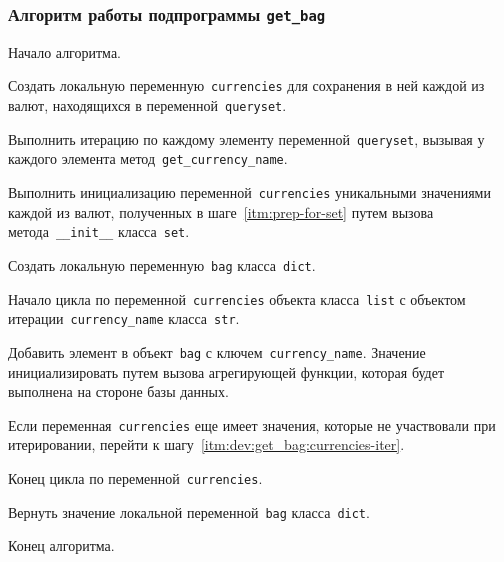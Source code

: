 \subsubsection{Алгоритм работы подпрограммы \lstinline{get_bag}}

\begin{enumerate_step}
    \item Начало алгоритма.

    \item Создать локальную переменную~\lstinline{currencies} для сохранения в ней каждой из валют, находящихся в переменной~\lstinline{queryset}.
    \item\label{itm:dev:get_bag:prep-for-set} Выполнить итерацию по каждому элементу переменной~\lstinline{queryset},
    вызывая у каждого элемента метод~\lstinline{get_currency_name}.
    \item Выполнить инициализацию переменной~\lstinline{currencies} уникальными значениями каждой из валют,
    полученных в шаге~\ref{itm:prep-for-set} путем вызова метода~\lstinline{__init__} класса~\lstinline{set}.

    \item Создать локальную переменную~\lstinline{bag} класса~\lstinline{dict}.

    \item\label{itm:dev:get_bag:currencies-iter}
    Начало цикла по переменной~\lstinline{currencies} объекта класса~\lstinline{list}
    с объектом итерации~\lstinline{currency_name} класса~\lstinline{str}.
    \item Добавить элемент в объект~\lstinline{bag} с ключем~\lstinline{currency_name}.
    Значение инициализировать путем вызова агрегирующей функции, которая будет выполнена на стороне базы данных.

    \item Если переменная~\lstinline{currencies} еще имеет значения,
    которые не участвовали при итерировании, перейти к шагу~\ref{itm:dev:get_bag:currencies-iter}.
    \item Конец цикла по переменной~\lstinline{currencies}.

    \item Вернуть значение локальной переменной~\lstinline{bag} класса~\lstinline{dict}.

    \item Конец алгоритма.
\end{enumerate_step}

